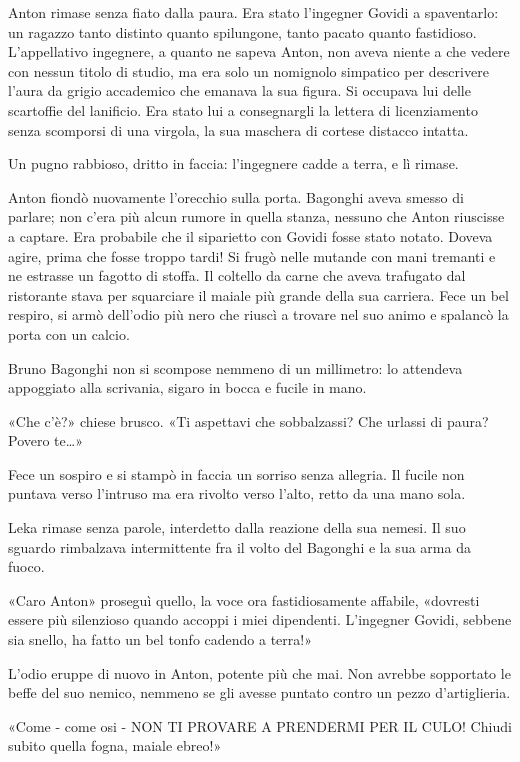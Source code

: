 Anton rimase senza fiato dalla paura. Era stato l'ingegner Govidi a spaventarlo: un ragazzo tanto distinto quanto spilungone, tanto pacato quanto fastidioso. L'appellativo ingegnere, a quanto ne sapeva Anton, non aveva niente a che vedere con nessun titolo di studio, ma era solo un nomignolo simpatico per descrivere l'aura da grigio accademico che emanava la sua figura. Si occupava lui delle scartoffie del lanificio. Era stato lui a consegnargli la lettera di licenziamento senza scomporsi di una virgola, la sua maschera di cortese distacco intatta.

Un pugno rabbioso, dritto in faccia: l'ingegnere cadde a terra, e lì rimase.

Anton fiondò nuovamente l'orecchio sulla porta. Bagonghi aveva smesso di parlare; non c'era più alcun rumore in quella stanza, nessuno che Anton riuscisse a captare. Era probabile che il siparietto con Govidi fosse stato notato. Doveva agire, prima che fosse troppo tardi! Si frugò nelle mutande con mani tremanti e ne estrasse un fagotto di stoffa. Il coltello da carne che aveva trafugato dal ristorante stava per squarciare il maiale più grande della sua carriera. Fece un bel respiro, si armò dell'odio più nero che riuscì a trovare nel suo animo e spalancò la porta con un calcio.

Bruno Bagonghi non si scompose nemmeno di un millimetro: lo attendeva appoggiato alla scrivania, sigaro in bocca e fucile in mano.

«Che c'è?» chiese brusco. «Ti aspettavi che sobbalzassi? Che urlassi di paura? Povero te\ldots»

Fece un sospiro e si stampò in faccia un sorriso senza allegria. Il fucile non puntava verso l'intruso ma era rivolto verso l'alto, retto da una mano sola.

Leka rimase senza parole, interdetto dalla reazione della sua nemesi. Il suo sguardo rimbalzava intermittente fra il volto del Bagonghi e la sua arma da fuoco.

«Caro Anton» proseguì quello, la voce ora fastidiosamente affabile, «dovresti essere più silenzioso quando accoppi i miei dipendenti. L'ingegner Govidi, sebbene sia snello, ha fatto un bel tonfo cadendo a terra!»

L'odio eruppe di nuovo in Anton, potente più che mai. Non avrebbe sopportato le beffe del suo nemico, nemmeno se gli avesse puntato contro un pezzo d'artiglieria.

«Come - come osi - NON TI PROVARE A PRENDERMI PER IL CULO! Chiudi subito quella fogna, maiale ebreo!»

